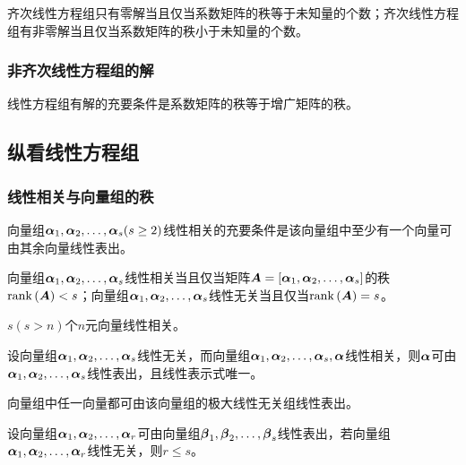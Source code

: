 \documentclass{ctexart}
\begin{document}
\begin{theorem}
    齐次线性方程组只有零解当且仅当系数矩阵的秩等于未知量的个数；齐次线性方程组有非零解当且仅当系数矩阵的秩小于未知量的个数。
\end{theorem}

\subsubsection*{非齐次线性方程组的解}

\begin{theorem}
    线性方程组有解的充要条件是系数矩阵的秩等于增广矩阵的秩。
\end{theorem}

\subsection{纵看线性方程组}

\subsubsection*{线性相关与向量组的秩}

\begin{theorem}
    向量组\(\enums{\vecal}{s}(s\ge2)\)线性相关的充要条件是该向量组中至少有一个向量可由其余向量线性表出。
\end{theorem}

\begin{theorem}
    向量组\(\enums{\vecal}{s}\)线性相关当且仅当矩阵\(\mata=\mat{\enums{\vecal}{s}}\)的秩\(\rank{\mata}<s\)；向量组\(\enums{\vecal}{s}\)线性无关当且仅当\(\rank{\mata}=s\)。
\end{theorem}

\begin{infer}
    \(s(s>n)\)个\(n\)元向量线性相关。
\end{infer}

\begin{lemma}
    设向量组\(\enums{\vecal}{s}\)线性无关，而向量组\(\enums{\vecal}{s},\vecal\)线性相关，则\(\vecal\)可由\(\enums{\vecal}{s}\)线性表出，且线性表示式唯一。
\end{lemma}

\begin{theorem}
    向量组中任一向量都可由该向量组的极大线性无关组线性表出。
\end{theorem}

\begin{lemma}
    设向量组\(\enums{\vecal}{r}\)可由向量组\(\enums{\vecbeta}{s}\)线性表出，若向量组\(\enums{\vecal}{r}\)线性无关，则\(r\le s\)。
\end{lemma}
\end{document}
